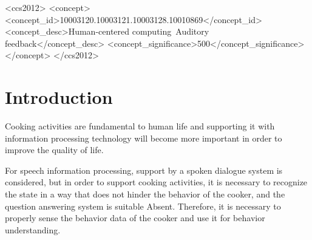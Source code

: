 \documentclass[sigchi]{acmart}
\begin{document}
%
%
\begin{CCSXML}
<ccs2012>
<concept>
<concept_id>10003120.10003121.10003128.10010869</concept_id>
<concept_desc>Human-centered computing~Auditory feedback</concept_desc>
<concept_significance>500</concept_significance>
</concept>
</ccs2012>
\end{CCSXML}


%

%

%
\maketitle

\section{Introduction}

Cooking activities are fundamental to human life and supporting it with information processing technology will become more important in order to improve the quality of life\cite{Uriu2012}.

For speech information processing, support by a spoken dialogue system is considered, but in order to support cooking activities, it is necessary to recognize the state in a way that does not hinder the behavior of the cooker, and the question answering system is suitable Absent. Therefore, it is necessary to properly sense the behavior data of the cooker and use it for behavior understanding.
\end{document}
